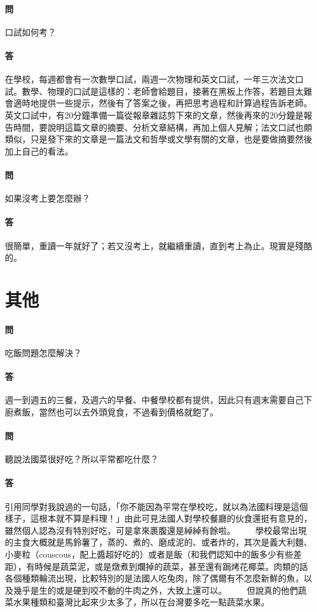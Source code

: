 \documentclass[a4paper]{article}
\begin{document}
\paragraph{問}
口試如何考？
\paragraph{答}
在學校，每週都會有一次數學口試，兩週一次物理和英文口試，一年三次法文口試。數學、物理的口試是這樣的：老師會給題目，接著在黑板上作答，若題目太難會適時地提供一些提示，然後有了答案之後，再把思考過程和計算過程告訴老師。英文口試中，有20分鐘準備一篇從報章雜誌剪下來的文章，然後再來的20分鐘是報告時間，要說明這篇文章的摘要、分析文章結構，再加上個人見解；法文口試也頗類似，只是發下來的文章是一篇法文和哲學或文學有關的文章，也是要做摘要然後加上自己的看法。
\paragraph{問}
如果沒考上要怎麼辦？
\paragraph{答}
很簡單，重讀一年就好了；若又沒考上，就繼續重讀，直到考上為止。現實是殘酷的。


\section{其他}
\paragraph{問}
吃飯問題怎麼解決？
\paragraph{答}
週一到週五的三餐，及週六的早餐、中餐學校都有提供，因此只有週末需要自己下廚煮飯，當然也可以去外頭覓食，不過看到價格就飽了。
\paragraph{問}
聽說法國菜很好吃？所以平常都吃什麼？
\paragraph{答}
引用同學對我說過的一句話，「你不能因為平常在學校吃，就以為法國料理是這個樣子，這根本就不算是料理！」由此可見法國人對學校餐廳的伙食還挺有意見的，雖然個人認為沒有特別好吃，可是拿來裹腹還是綽綽有餘啦。
　　學校最常出現的主食大概就是馬鈴薯了，蒸的、煮的、磨成泥的、或者炸的，其次是義大利麵、小麥粒（couscous，配上醬超好吃的）或者是飯（和我們認知中的飯多少有些差距），有時候是蔬菜泥，或是燉煮到爛掉的蔬菜，甚至還有跼烤花椰菜。肉類的話各個種類輪流出現，比較特別的是法國人吃兔肉，除了偶爾有不怎麼新鮮的魚，以及幾乎是生的或是硬到咬不動的牛肉之外，大致上還可以。
　　但說真的他們蔬菜水果種類和臺灣比起來少太多了，所以在台灣要多吃一點蔬菜水果。
\end{document}

